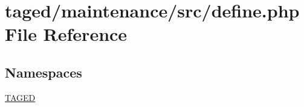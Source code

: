 \hypertarget{maintenance_2src_2define_8php}{}\section{taged/maintenance/src/define.php File Reference}
\label{maintenance_2src_2define_8php}
\subsection*{Namespaces}
\begin{DoxyCompactItemize}
\item 
 \hyperlink{namespace_t_a_g_e_d}{T\+A\+G\+ED}
\end{DoxyCompactItemize}
